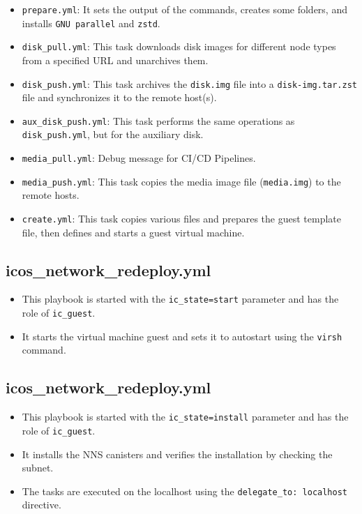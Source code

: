 \begin{itemize}
    \item \texttt{prepare.yml}: It sets the output of the commands, creates some folders, and installs \texttt{GNU parallel} and 
    \texttt{zstd}.
    \item \texttt{disk\_pull.yml}: This task downloads disk images for different node types from a specified URL and unarchives 
    them.
    \item \texttt{disk\_push.yml}: This task archives the \texttt{disk.img} file into a \texttt{disk-img.tar.zst} file and 
    synchronizes it to the remote host(s).
    \item \texttt{aux\_disk\_push.yml}: This task performs the same operations as \texttt{disk\_push.yml}, but for the auxiliary 
    disk.
    \item \texttt{media\_pull.yml}: Debug message for CI/CD Pipelines.
    \item \texttt{media\_push.yml}: This task copies the media image file (\texttt{media.img}) to the remote hosts.
    \item \texttt{create.yml}: This task copies various files and prepares the guest template file, then defines and starts a guest virtual machine.
\end{itemize}

\subsection{icos\_network\_redeploy.yml}

\begin{itemize}
    \item This playbook is started with the \texttt{ic\_state=start} parameter and has the role of \texttt{ic\_guest}.
    \item It starts the virtual machine guest and sets it to autostart using the \texttt{virsh} command.
\end{itemize}

\subsection{icos\_network\_redeploy.yml}

\begin{itemize}
    \item This playbook is started with the \texttt{ic\_state=install} parameter and has the role of \texttt{ic\_guest}.
    \item It installs the NNS canisters and verifies the installation by checking the subnet.
    \item The tasks are executed on the localhost using the \texttt{delegate\_to: localhost} directive.
\end{itemize}

